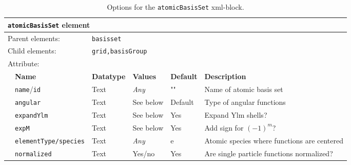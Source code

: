 \begin{table}[h]
\begin{center}
\begin{tabularx}{\textwidth}{l l l l l X }
\hline
\multicolumn{6}{l}{\texttt{atomicBasisSet} element} \\
\hline
\multicolumn{2}{l}{Parent elements:} & \multicolumn{4}{l}{\texttt{basisset}}\\
\multicolumn{2}{l}{Child  elements:} & \multicolumn{4}{l}{\texttt{grid,basisGroup}}\\
\multicolumn{2}{l}{Attribute:} & \multicolumn{4}{l}{}\\
   &   \bfseries Name              & \bfseries Datatype & \bfseries Values & \bfseries Default   & \bfseries Description \\
   &   \texttt{name}/\texttt{id}   &  Text              &  \textit{Any}    &  ""                & Name of atomic basis set \\
   &   \texttt{angular}               &  Text              &  See below    &  Default       & Type of angular functions  \\
   &   \texttt{expandYlm}         &  Text              &  See below   &  Yes                &  Expand Ylm shells? \\  
   &   \texttt{expM}                  &  Text              &  See below   &  Yes                &  Add sign for $(-1)^{m}$? \\  
   &   \texttt{elementType/species}   &  Text  &  \textit{Any}    &  e                &  Atomic species where functions are centered \\
   &   \texttt{normalized}         &  Text              &  Yes/no   &  Yes                &  Are single particle functions normalized? \\   
  \hline
\end{tabularx}
\end{center}
\caption{Options for the \texttt{atomicBasisSet} xml-block.}
\label{table:atomicBasisSet}
\end{table}

